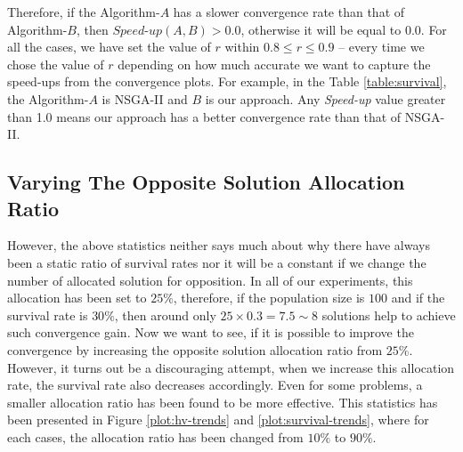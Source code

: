 \documentclass[journal]{IEEEtran}
\let\MYoriglatexcaption\caption
\renewcommand{\caption}[2][\relax]{\MYoriglatexcaption[#2]{#2}}
\begin{document}
Therefore, if the Algorithm-\(A\) has a slower convergence rate than that of Algorithm-\(B\), then \(\textit{Speed-up}(A,B) > 0.0\), otherwise it will be equal to 0.0. For all the cases, we have set the value of \(r\) within \(0.8 \le r \le 0.9\) -- every time we chose the value of \(r\) depending on how much accurate we want to capture the speed-ups from the convergence plots. For example, in the Table \ref{table:survival}, the Algorithm-\(A\) is NSGA-II and \(B\) is our approach. Any \textit{Speed-up} value greater than 1.0 means our approach has a better convergence rate than that of NSGA-II.

%
\begin{figure*}[!htp]
	\centering
	\hfill
	\caption{These plots illustrates the mean-static survival-rates for 2 and 3-objective problems, with varying rates for opposite point allocation ratio. In both cases we can see that the rate of survival decreases with increase in the allocation ratio.}
	\label{plot:survival-trends}
\end{figure*}
%
%
\begin{figure*}[!hbp]
	\centering
	\hfill
	\caption{This figure illustrates the ``hit-and-spread'' nature of the single pivot point case. This plot demonstrated a scenario for ZDT4 problem, here we can clearly see trajectory of the optimization procedure.}
	\label{plot:hit-n-spread}
\end{figure*}
%
\subsection{Varying The Opposite Solution Allocation Ratio}
\label{subsec:op-ratio}
However, the above statistics neither says much about why there have always been a static ratio of survival rates nor it will be a constant if we change the number of allocated solution for opposition. In all of our experiments, this allocation has been set to \(25\%\), therefore, if the population size is \(100\) and if the survival rate is \(30\%\), then around only \(25 \times 0.3 = 7.5 \sim 8\) solutions help to achieve such convergence gain. Now we want to see, if it is possible to improve the convergence by increasing the opposite solution allocation ratio from \(25\%\). However, it turns out be a discouraging attempt, when we increase this allocation rate, the survival rate also decreases accordingly. Even for some problems, a smaller allocation ratio has been found to be more effective. This statistics has been presented in Figure \ref{plot:hv-trends} and \ref{plot:survival-trends}, where for each cases, the allocation ratio has been changed from \(10\%\) to \(90\%\).
\end{document}
